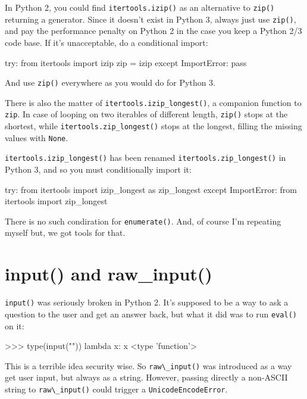 In Python 2, you could find \lstinline{itertools.izip()} as an alternative to \lstinline{zip()} returning a generator. Since it doesn't exist in Python 3, always just use \lstinline{zip()}, and pay the performance penalty on Python 2 in the case you keep a Python 2/3 code base. If it's unacceptable, do a conditional import:

\begin{py2and3}
try:
    from itertools import izip
    zip = izip
except ImportError:
    pass
\end{py2and3}

And use \lstinline{zip()} everywhere as you would do for Python 3.

There is also the matter of \lstinline{itertools.izip_longest()}, a companion function to \lstinline{zip}. In case of looping on two iterables of different length, \lstinline{zip()} stops at the shortest, while \lstinline{itertools.zip_longest()} stops at the longest, filling the missing values with \lstinline{None}.

\lstinline{itertools.izip_longest()} has been renamed \lstinline{itertools.zip_longest()} in Python 3, and so you must conditionally import it:

\begin{py2and3}
try:
    from itertools import izip_longest as zip_longest
except ImportError:
    from itertools import zip_longest
\end{py2and3}

There is no such condiration for \lstinline{enumerate()}. And, of course I'm repeating myself but, we got tools for that.

\section{input() and raw\_input()}

\lstinline{input()} was seriously broken in Python 2. It's supposed to be a way to ask a question to the user and get an answer back, but what it did was to run \lstinline{eval()} on it:

\begin{py2}
>>> type(input(""))
lambda x: x
<type 'function'>
\end{py2}

This is a terrible idea security wise. So \lstinline{raw\_input()} was introduced as a way get user input, but always as a string. However, passing directly a non-ASCII string to \lstinline{raw\_input()} could trigger a \lstinline{UnicodeEncodeError}.


